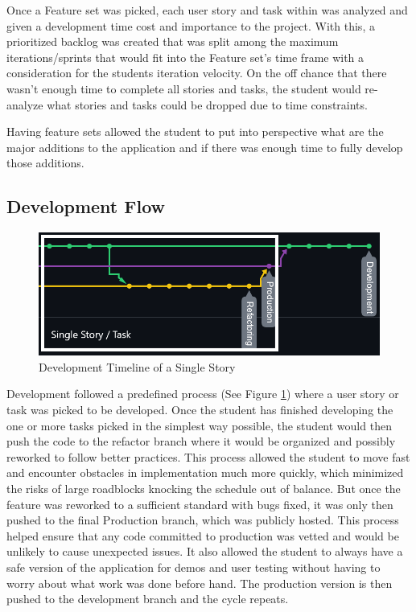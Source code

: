 Once a Feature set was picked, each user story and task within was analyzed and given a development time cost and importance to the project. With this, a prioritized backlog was created that was split among the maximum iterations/sprints that would fit into the Feature set's time frame with a consideration for the students iteration velocity. On the off chance that there wasn't enough time to complete all stories and tasks, the student would re-analyze what stories and tasks could be dropped due to time constraints.

Having feature sets allowed the student to put into perspective what are the major additions to the application and if there was enough time to fully develop those additions.

\subsection{Development Flow}
\begin{figure}
    \centering
    \includegraphics[width=1\columnwidth]{author-files/figures/SingleStoryPath2.png}
    \caption{Development Timeline of a Single Story}
    \label{fig:singlestory}
\end{figure}

Development followed a predefined process (See Figure \ref{fig:singlestory}) where a user story or task was picked to be developed. Once the student has finished developing the one or more tasks picked in the simplest way possible, the student would then push the code to the refactor branch where it would be organized and possibly reworked to follow better practices. This process allowed the student to move fast and encounter obstacles in implementation much more quickly, which minimized the risks of large roadblocks knocking the schedule out of balance. But once the feature was reworked to a sufficient standard with bugs fixed, it was only then pushed to the final Production branch, which was publicly hosted.
This process helped ensure that any code committed to production was vetted and would be unlikely to cause unexpected issues. It also allowed the student to always have a safe version of the application for demos and user testing without having to worry about what work was done before hand.
The production version is then pushed to the development branch and the cycle repeats.


